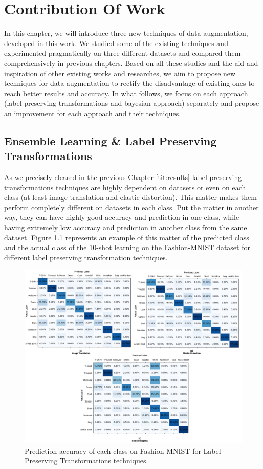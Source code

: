 \chapter{Contribution Of Work}
\label{tit:Contribution_of_Work}
In this chapter, we will introduce three new techniques of data augmentation, developed in this
work. We studied some of the existing techniques and experimented pragmatically on three different
datasets and compared them comprehensively in previous chapters. Based on all these studies and the
aid and inspiration of other existing works and researches, we aim to propose new techniques for
data augmentation to rectify the disadvantage of existing ones to reach better results and accuracy.
In what follows, we focus on each approach (label preserving transformations and bayesian approach)
separately and propose an improvement for each approach and their techniques.

\section{Ensemble Learning \& Label Preserving Transformations}
As we precisely cleared in the previous Chapter \ref{tit:results} label preserving
transformations techniques are highly dependent on datasets or even on each class (at least image
translation and elastic distortion). This matter makes them perform completely different on
datasets in each class. Put the matter in another way, they can have highly
good accuracy and prediction in one class, while having extremely low accuracy and prediction in another
class from the same dataset. Figure \ref{fig:Fashion_MNIST_Heatmaps} represents an example of this
matter of the predicted class
and the actual class of the 10-shot learning on the Fashion-MNIST dataset for different label
preserving transformation techniques.

\begin{figure}
  \centering
  \label{fig:Fashion_MNIST_Heatmaps}
  \includegraphics[width=1.1\textwidth]{fig/contribution/Fashion_MNIST_Heatmap}
  \caption{Prediction accuracy of each class on Fashion-MNIST for Label Preserving Transformations techniques.}
\end{figure}


